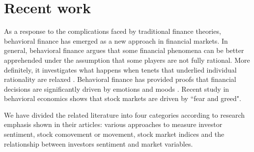\documentclass[review,3p,times,12pt,number]{elsarticle}
\begin{document}
\section{Recent work}
\label{sec:weibo:lr}
As a response to the complications faced by traditional finance theories, behavioral finance has emerged as a new approach in financial markets. In general, behavioral finance argues that some financial phenomena can be better apprehended under the assumption that some players are not fully rational. More definitely, it investigates what happens when tenets that underlied individual rationality are relaxed \cite{Barberis2002}. Behavioral finance has provided proofs that financial decisions are significantly driven by emotions and moods \cite{Nofsinger2005}. Recent study in behavioral economics shows that stock markets are driven by ``fear and greed". %
\indent

We have divided the related literature into four categories according to research emphasis shown in their articles: various approaches to measure investor sentiment, stock comovement or movement, stock market indices and the relationship between investors sentiment and market variables.
\end{document}
